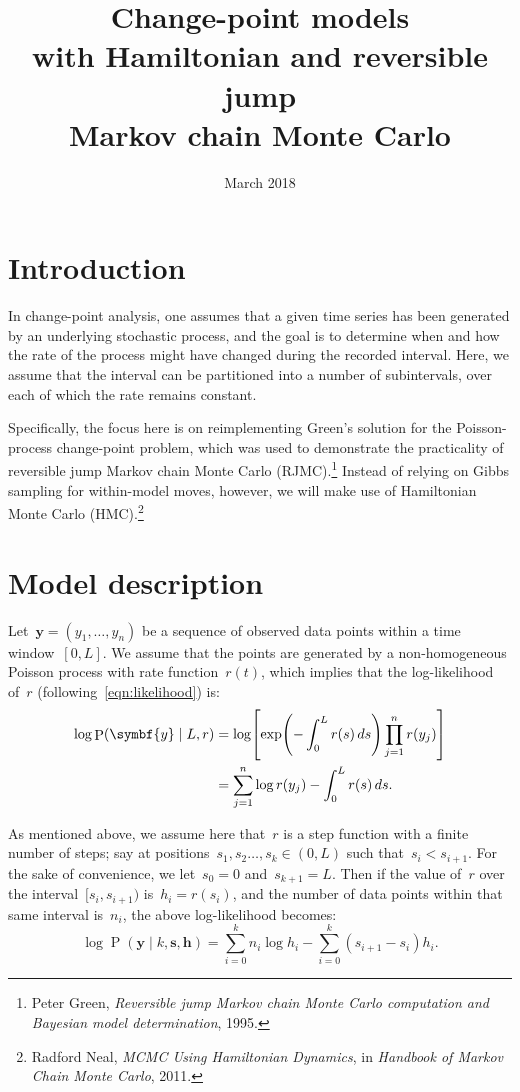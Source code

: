 \documentclass[11pt,a4paper]{article}
\title{Change-point models \\[.25em]
  \large with Hamiltonian and reversible jump \\
    Markov chain Monte Carlo}
\author{}
\date{March 2018}
\newcommand\ub[1]{\symbf{#1}}                    %
\DeclareMathOperator\Pb{P}                       %
\DeclarePairedDelimiter\lr{\lparen}{\rparen}     %
\DeclarePairedDelimiter\lrb{\lbrack}{\rbrack}    %
\theoremstyle{definition}
\begin{document}
\maketitle

\section{Introduction} %

In change-point analysis, one assumes that a given time series has been
generated by an underlying stochastic process, and the goal is to determine when
and how the rate of the process might have changed during the recorded interval.
Here, we assume that the interval can be partitioned into a number of
subintervals, over each of which the rate remains constant.

Specifically, the focus here is on reimplementing Green's solution for the
Poisson-process change-point problem, which was used to demonstrate the
practicality of reversible jump Markov chain Monte Carlo (RJMC).\footnote{Peter
Green, \textit{Reversible jump Markov chain Monte Carlo computation and Bayesian
model determination}, 1995.} Instead of relying on Gibbs sampling for
within-model moves, however, we will make use of Hamiltonian Monte Carlo
(HMC).\footnote{Radford Neal, \textit{MCMC Using Hamiltonian Dynamics}, in
\textit{Handbook of Markov Chain Monte Carlo}, 2011.}

\section{Model description} %
\label{sec:model}

Let~$\ub{y} = (y_1,\dots,y_n)$ be a sequence of observed data points within a
time window~$[0,L]$. We assume that the points are generated by a
non-homogeneous Poisson process with rate function~$r(t)$, which implies that
the log-likelihood of~$r$ (following~\eqref{eqn:likelihood}) is:
\begin{align*}
  \log\Pb(\ub{y} \mid L,r)
    &= \log\lrb*{\exp\lr*{-\int_0^L r(s)\,ds} \prod_{j=1}^n r(y_j)} \\
    &= \sum_{j=1}^n \log r(y_j) - \int_0^L r(s)\,ds.
\end{align*}

As mentioned above, we assume here that~$r$ is a step function with a finite
number of steps; say at positions~$s_1,s_2 \dots,s_k \in (0,L)$ such that~$s_i <
s_{i+1}$. For the sake of convenience, we let~$s_0 = 0$ and~$s_{k+1} = L$. Then
if the value of~$r$ over the interval~$[s_i,s_{i+1})$ is~$h_i = r(s_i)$, and the
number of data points within that same interval is~$n_i$, the above
log-likelihood becomes:
\begin{equation}
  \log \Pb(\ub{y} \mid k,\ub{s},\ub{h})
    = \sum_{i=0}^k n_i\log h_i - \sum_{i=0}^k (s_{i+1} - s_i) h_i.
\end{equation}
\end{document}
